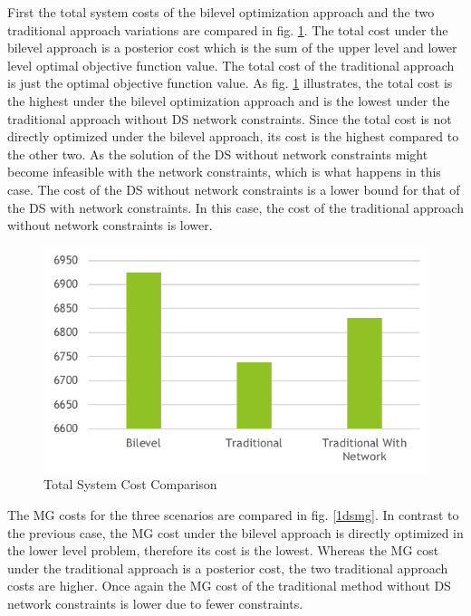 First the total system costs of the bilevel optimization approach and the two traditional approach variations are compared in fig. \ref{1dstotal}. The total cost under the bilevel approach is a posterior cost which is the sum of the upper level and lower level optimal objective function value. The total cost of the traditional approach is just the optimal objective function value. As fig. \ref{1dstotal} illustrates, the total cost is the highest under the bilevel optimization approach and is the lowest under the traditional approach without DS network constraints. Since the total cost is not directly optimized under the bilevel approach, its cost is the highest compared to the other two. As the solution of the DS without network constraints might become infeasible with the network constraints, which is what happens in this case. The cost of the DS without network constraints is a lower bound for that of the DS with network constraints. In this case, the cost of the traditional approach without network constraints is lower. 

\begin{figure}[H]
\centering
\includegraphics[scale=0.4]{1dstotal.png}
\caption{Total System Cost Comparison}
\label{1dstotal}
\end{figure}

The MG costs for the three scenarios are compared in fig. \ref{1dsmg}. In contrast to the previous case, the MG cost under the bilevel approach is directly optimized in the lower level problem, therefore its cost is the lowest. Whereas the MG cost under the traditional approach is a posterior cost, the two traditional approach costs are higher. Once again the MG cost of the traditional method without DS network constraints is lower due to fewer constraints.

